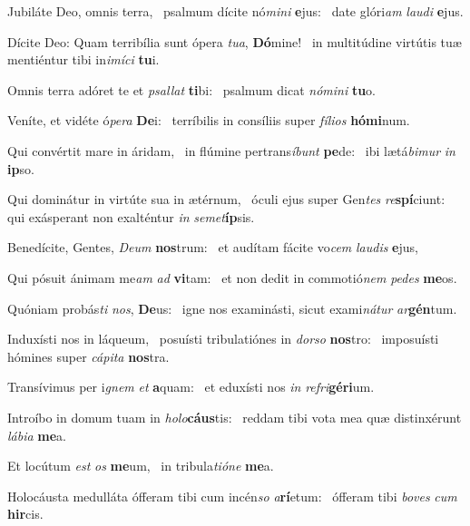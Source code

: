 \item Jubiláte Deo, omnis terra,~\pscross{} psalmum dícite nó\textit{mini} \textbf{e}jus:~\psstar{} date glóri\textit{am} \textit{laudi} \textbf{e}jus.
\item Dícite Deo: Quam terribília sunt ópera \textit{tua}, \textbf{Dó}mine!~\psstar{} in multitúdine virtútis tuæ mentiéntur tibi in\textit{imíci} \textbf{tu}i.
\item Omnis terra adóret te et \textit{psallat} \textbf{ti}bi:~\psstar{} psalmum dicat \textit{nómini} \textbf{tu}o.
\item Veníte, et vidéte ó\textit{pera} \textbf{De}i:~\psstar{} terríbilis in consíliis super \textit{fílios} \textbf{hó}\textbf{mi}num.
\item Qui convértit mare in áridam,~\pscross{} in flúmine pertrans\textit{íbunt} \textbf{pe}de:~\psstar{} ibi lætá\textit{bimur} \textit{in} \textbf{ip}so.
\item Qui dominátur in virtúte sua in ætérnum,~\pscross{} óculi ejus super Gen\textit{tes} \textit{re}\textbf{spí}ciunt:~\psstar{} qui exásperant non exalténtur \textit{in} \textit{semet}\textbf{íp}sis.
\item Benedícite, Gentes, \textit{Deum} \textbf{nos}trum:~\psstar{} et audítam fácite vo\textit{cem} \textit{laudis} \textbf{e}jus,
\item Qui pósuit ánimam me\textit{am} \textit{ad} \textbf{vi}tam:~\psstar{} et non dedit in commotió\textit{nem} \textit{pedes} \textbf{me}os.
\item Quóniam probás\textit{ti} \textit{nos}, \textbf{De}us:~\psstar{} igne nos examinásti, sicut exami\textit{nátur} \textit{ar}\textbf{gén}tum.
\item Induxísti nos in láqueum,~\pscross{} posuísti tribulatiónes in \textit{dorso} \textbf{nos}tro:~\psstar{} imposuísti hómines super \textit{cápita} \textbf{nos}tra.
\item Transívimus per i\textit{gnem} \textit{et} \textbf{a}quam:~\psstar{} et eduxísti nos \textit{in} \textit{refri}\textbf{gé}\textbf{ri}um.
\item Introíbo in domum tuam in \textit{holo}\textbf{cáus}tis:~\psstar{} reddam tibi vota mea quæ distinxérunt \textit{lábia} \textbf{me}a.
\item Et locútum \textit{est} \textit{os} \textbf{me}um,~\psstar{} in tribula\textit{tióne} \textbf{me}a.
\item Holocáusta medulláta ófferam tibi cum incén\textit{so} \textit{a}\textbf{rí}etum:~\psstar{} ófferam tibi \textit{boves} \textit{cum} \textbf{hir}cis.
